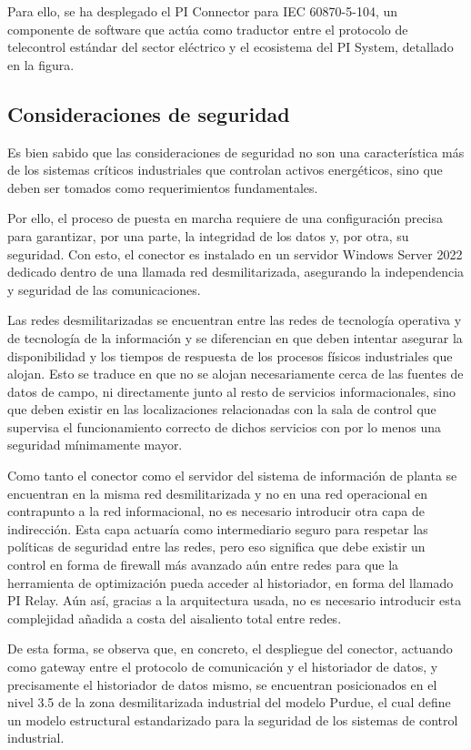 Para ello, se ha desplegado el PI Connector para IEC 60870-5-104, un componente de software que actúa como traductor entre el protocolo de telecontrol estándar del sector eléctrico y el ecosistema del PI System, detallado en la figura.

\subsection{Consideraciones de seguridad}
\label{makereference3.4.2}

Es bien sabido que las consideraciones de seguridad no son una característica más de los sistemas críticos industriales que controlan activos energéticos, sino que deben ser tomados como requerimientos fundamentales.

Por ello, el proceso de puesta en marcha requiere de una configuración precisa para garantizar, por una parte, la integridad de los datos y, por otra, su seguridad. Con esto, el conector es instalado en un servidor Windows Server 2022 dedicado dentro de una llamada red desmilitarizada, asegurando la independencia y seguridad de las comunicaciones.

Las redes desmilitarizadas se encuentran entre las redes de tecnología operativa y de tecnología de la información y se diferencian en que deben intentar asegurar la disponibilidad y los tiempos de respuesta de los procesos físicos industriales que alojan. Esto se traduce en que no se alojan necesariamente cerca de las fuentes de datos de campo, ni directamente junto al resto de servicios informacionales, sino que deben existir en las localizaciones relacionadas con la sala de control que supervisa el funcionamiento correcto de dichos servicios con por lo menos una seguridad mínimamente mayor.

Como tanto el conector como el servidor del sistema de información de planta se encuentran en la misma red desmilitarizada y no en una red operacional en contrapunto a la red informacional, no es necesario introducir otra capa de indirección. Esta capa actuaría como intermediario seguro para respetar las políticas de seguridad entre las redes, pero eso significa que debe existir un control en forma de firewall más avanzado aún entre redes para que la herramienta de optimización pueda acceder al historiador, en forma del llamado PI Relay. Aún así, gracias a la arquitectura usada, no es necesario introducir esta complejidad añadida a costa del aisaliento total entre redes.

De esta forma, se observa que, en concreto, el despliegue del conector, actuando como gateway entre el protocolo de comunicación y el historiador de datos, y precisamente el historiador de datos mismo, se encuentran posicionados en el nivel 3.5 de la zona desmilitarizada industrial del modelo Purdue, el cual define un modelo estructural estandarizado para la seguridad de los sistemas de control industrial.

